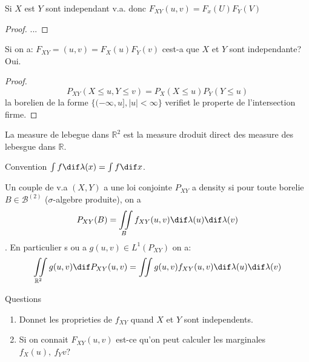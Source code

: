 \begin{proposition}
	Si $X$ est $Y$ sont independant v.a. donc $F_{XY}(u, v)=F_x(U) F_Y(V)$
\end{proposition}
\begin{proof}
	...
\end{proof}

\begin{proposition}	
	Si on a: $F_{XY}=(u, v)=F_X(u)F_Y(v)$ cest-a que $X$ et $Y$ sont independante? Oui.
\end{proposition}
\begin{proof}
	$$P_{XY}(X\leq u, Y\leq v)=P_X(X\leq u)P_Y(Y\leq u)$$
	la borelien de la forme $\{(-\infty, u], |u|<\infty\}$ verifiet le properte de l'intersection firme.
\end{proof}

\begin{definition}
	La measure de lebegue dans $\mathbb{R}^2$ est la measure droduit direct des measure des lebesgue dans $\mathbb{R}$.
\end{definition}

Convention $\int f\dif \lambda(x)=\int f \dif x$.

\begin{definition}
	Un couple de v.a $(X, Y)$ a une loi conjointe $P_{XY}$ a density si pour toute borelie $B\in\mathcal{B}^{(2)}$ ($\sigma$-algebre produite), on a
	$$P_{XY}(B)=\iint\limits_{B}f_{XY}(u, v)\dif\lambda(u)\dif\lambda(v)$$. En particulier s ou a $g(u,v)\in L^1(P_{XY})$ on a:
	$$\iint\limits_{\mathbb{R}^2}g(u, v)\dif P_{XY}(u, v)=\iint g(u,v) f_{XY}(u, v)\dif \lambda(u) \dif \lambda(v)$$
\end{definition}

Questions
\begin{enumerate}
	\item Donnet les proprieties de $f_{XY}$ quand $X$ et $Y$ sont independents.
	\item Si on connait $F_{XY}(u, v)$ est-ce qu'on peut calculer les marginales $f_X(u),\ f_Y{v}$?
\end{enumerate}

